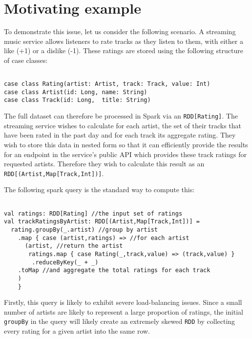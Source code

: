 \section{Motivating example} {

To demonstrate this issue, let us consider the following scenario. A streaming music service allows listeners to rate tracks as they listen to them, with either a like (+1) or a dislike (-1). These ratings are stored using the following structure of case classes:

\begin{lstlisting}

case class Rating(artist: Artist, track: Track, value: Int)
case class Artist(id: Long, name: String)
case class Track(id: Long,  title: String)

\end{lstlisting}

The full dataset can therefore be processed in Spark via an \lstinline{RDD[Rating]}. The streaming service wishes to calculate for each artist, the set of their tracks that have been rated in the past day and for each track its aggregate rating. They wish to store this data in nested form so that it can efficiently provide the results for an endpoint in the service's public API which provides these track ratings for requested artists. Therefore they wish to calculate this result as an \lstinline{RDD[(Artist,Map[Track,Int])]}. 

The following spark query is the standard way to compute this:

\begin{lstlisting}

val ratings: RDD[Rating] //the input set of ratings
val trackRatingsByArtist: RDD[(Artist,Map[Track,Int])] =
  rating.groupBy(_.artist) //group by artist
    .map { case (artist,ratings) => //for each artist
      (artist, //return the artist
       ratings.map { case Rating(_,track,value) => (track,value) } 
        .reduceByKey(_ + _)
	.toMap //and aggregate the total ratings for each track
	)
    }

\end{lstlisting}

Firstly, this query is likely to exhibit severe load-balancing issues. Since a small number of artists are likely to represent a large proportion of ratings, the initial \lstinline{groupBy} in the query will likely create an extremely skewed \lstinline{RDD} by collecting every rating for a given artist into the same row. 

}
